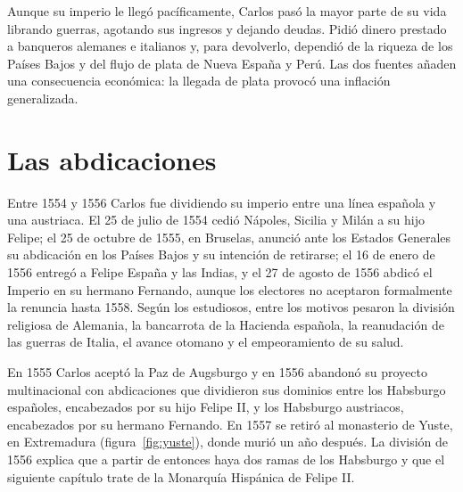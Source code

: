 \documentclass{book}
\begin{document}

Aunque su imperio le llegó pacíficamente, Carlos pasó la mayor parte de su vida librando guerras, agotando sus ingresos y dejando deudas. Pidió dinero prestado a banqueros alemanes e italianos y, para devolverlo, dependió de la riqueza de los Países Bajos y del flujo de plata de Nueva España y Perú. Las dos fuentes añaden una consecuencia económica: la llegada de plata provocó una inflación generalizada.


\section{Las abdicaciones}

Entre 1554 y 1556 Carlos fue dividiendo su imperio entre una línea española y una austriaca. El 25 de julio de 1554 cedió Nápoles, Sicilia y Milán a su hijo Felipe; el 25 de octubre de 1555, en Bruselas, anunció ante los Estados Generales su abdicación en los Países Bajos y su intención de retirarse; el 16 de enero de 1556 entregó a Felipe España y las Indias, y el 27 de agosto de 1556 abdicó el Imperio en su hermano Fernando, aunque los electores no aceptaron formalmente la renuncia hasta 1558. Según los estudiosos, entre los motivos pesaron la división religiosa de Alemania, la bancarrota de la Hacienda española, la reanudación de las guerras de Italia, el avance otomano y el empeoramiento de su salud.


En 1555 Carlos aceptó la Paz de Augsburgo y en 1556 abandonó su proyecto multinacional con abdicaciones que dividieron sus dominios entre los Habsburgo españoles, encabezados por su hijo Felipe II, y los Habsburgo austriacos, encabezados por su hermano Fernando. En 1557 se retiró al monasterio de Yuste, en Extremadura (figura~\ref{fig:yuste}), donde murió un año después. La división de 1556 explica que a partir de entonces haya dos ramas de los Habsburgo y que el siguiente capítulo trate de la Monarquía Hispánica de Felipe II.

\end{document}
